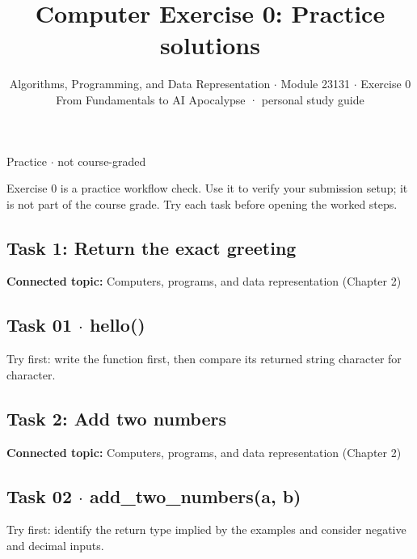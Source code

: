 \documentclass[11pt]{article}
\title{\sffamily\bfseries\color{FAUblue}Computer Exercise 0: Practice solutions}
\author{Algorithms, Programming, and Data Representation \ensuremath{\cdot} Module 23131 \ensuremath{\cdot} Exercise 0\\[2pt]\small From Fundamentals to AI Apocalypse · personal study guide}
\date{}
\begin{document}
\maketitle
\begingroup\footnotesize\setlength{\parskip}{0pt}\tableofcontents\endgroup
\clearpage

Practice \ensuremath{\cdot} not course-graded

{\large Exercise 0 is a practice workflow check. Use it to verify your submission setup; it is not part of the course grade. Try each task before opening the worked steps.}


\begin{keepsection}
\section{Task 1: Return the exact greeting}

\textbf{Connected topic:} Computers, programs, and data representation (Chapter 2)

\begin{keepsection}
\subsection{Task 01 \ensuremath{\cdot} hello()}

Try first: write the function first, then compare its returned string character for character.

\end{keepsection}
\end{keepsection}

\begin{keepsection}
\section{Task 2: Add two numbers}

\textbf{Connected topic:} Computers, programs, and data representation (Chapter 2)

\begin{keepsection}
\subsection{Task 02 \ensuremath{\cdot} add\_two\_numbers(a, b)}

Try first: identify the return type implied by the examples and consider negative and decimal inputs.

\end{keepsection}
\end{keepsection}
\end{document}
